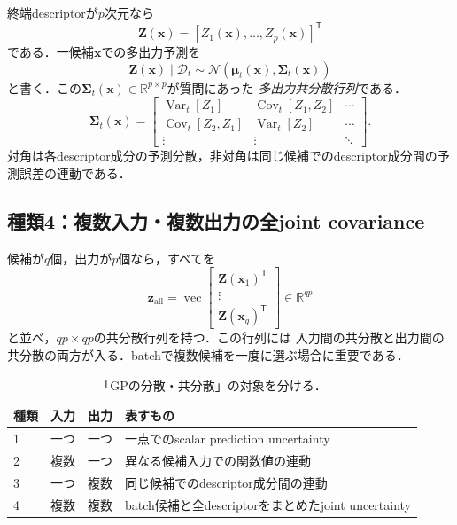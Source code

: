 \documentclass[a4paper,11pt]{ltjsarticle}
\newcommand{\R}{\mathbb R}
\newcommand{\N}{\mathcal N}
\newcommand{\D}{\mathcal D}
\newcommand{\T}{\mathsf T}
\newcommand{\Var}{\operatorname{Var}}
\newcommand{\Cov}{\operatorname{Cov}}
\begin{document}
終端descriptorが\(p\)次元なら
\begin{equation}
  \bm Z(\bm x)
  =[Z_1(\bm x),\ldots,Z_p(\bm x)]^\T
\end{equation}
である．一候補\(\bm x\)での多出力予測を
\begin{equation}
  \bm Z(\bm x)\mid\D_t
  \sim\N(\bm\mu_t(\bm x),\bm\Sigma_t(\bm x))
  \label{eq:multioutput-posterior}
\end{equation}
と書く．この\(\bm\Sigma_t(\bm x)\in\R^{p\times p}\)が質問にあった
\emph{多出力共分散行列}である．
\begin{equation}
  \bm\Sigma_t(\bm x)=
  \begin{bmatrix}
    \Var_t[Z_1]&\Cov_t[Z_1,Z_2]&\cdots\\
    \Cov_t[Z_2,Z_1]&\Var_t[Z_2]&\cdots\\
    \vdots&\vdots&\ddots
  \end{bmatrix}.
  \label{eq:multioutput-covariance-elements}
\end{equation}
対角は各descriptor成分の予測分散，非対角は同じ候補でのdescriptor成分間の予測誤差の連動である．

\subsection{種類4：複数入力・複数出力の全joint covariance}

候補が\(q\)個，出力が\(p\)個なら，すべてを
\begin{equation}
  \bm z_{\mathrm{all}}
  =\operatorname{vec}\begin{bmatrix}
    \bm Z(\bm x_1)^\T\\\vdots\\\bm Z(\bm x_q)^\T
  \end{bmatrix}
  \in\R^{qp}
\end{equation}
と並べ，\(qp\times qp\)の共分散行列を持つ．この行列には
入力間の共分散と出力間の共分散の両方が入る．batchで複数候補を一度に選ぶ場合に重要である．

\begin{table}[H]
\centering
\caption{「GPの分散・共分散」の対象を分ける．}
\label{tab:variance-types}
\begin{tabularx}{\textwidth}{C{12mm}C{28mm}C{29mm}Y}
\toprule
種類&入力&出力&表すもの\\
&一つ&一つ&一点でのscalar prediction uncertainty\\
2&複数&一つ&異なる候補入力での関数値の連動\\
3&一つ&複数&同じ候補でのdescriptor成分間の連動\\
4&複数&複数&batch候補と全descriptorをまとめたjoint uncertainty\\
\bottomrule
\end{tabularx}
\end{table}
\end{document}
